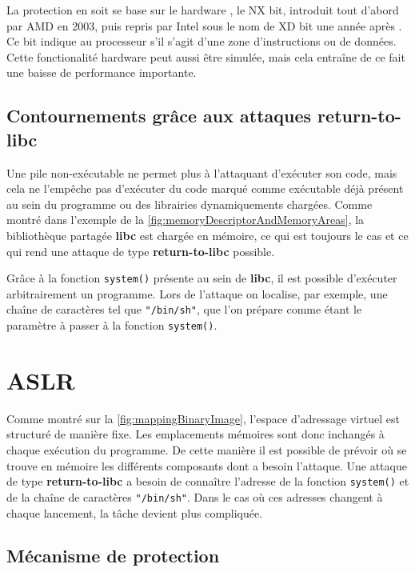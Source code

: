 La protection en soit se base sur le \og hardware \fg, le NX bit, introduit tout d'abord par AMD en 2003, puis repris par Intel sous le nom de XD bit une année après \cite{ExecutableSpaceProtection, NXBit}. Ce bit indique au processeur s'il s'agit d'une zone d'instructions ou de données. Cette fonctionalité \og hardware \fg peut aussi être simulée, mais cela entraîne de ce fait une baisse de performance importante.

\subsection{Contournements grâce aux attaques \og return-to-libc \fg}

Une pile non-exécutable ne permet plus à l'attaquant d'exécuter son code, mais cela ne l'empêche pas d'exécuter du code marqué comme exécutable déjà présent au sein du programme ou des librairies dynamiquements chargées. Comme montré dans l'exemple de la \autoref{fig:memoryDescriptorAndMemoryAreas}, la bibliothèque partagée \textbf{libc} est chargée en mémoire, ce qui est toujours le cas et ce qui rend une attaque de type \textbf{\og return-to-libc \fg} \cite{ReturntolibcAttack} possible.

Grâce à la fonction \texttt{system()} présente au sein de \textbf{libc}, il est possible d'exécuter arbitrairement un programme. Lors de l'attaque on localise, par exemple, une chaîne de caractères tel que \texttt{"/bin/sh"}, que l'on prépare comme étant le paramètre à passer à la fonction \texttt{system()}.

\section{ASLR}

Comme montré sur la \autoref{fig:mappingBinaryImage}, l'espace d'adressage virtuel est structuré de manière fixe. Les emplacements mémoires sont donc inchangés à chaque exécution du programme. De cette manière il est possible de prévoir où se trouve en mémoire les différents composants dont a besoin l'attaque. Une attaque de type \textbf{\og return-to-libc \fg} a besoin de connaître l'adresse de la fonction \texttt{system()} et de la chaîne de caractères \texttt{"/bin/sh"}. Dans le cas où ces adresses changent à chaque lancement, la tâche devient plus compliquée.

\subsection{Mécanisme de protection}

